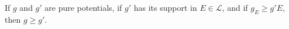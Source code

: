 If $g$ and $g'$ are pure potentials, if $g'$ has its support in $E \in \mathcal{L}$, and if $g_E \geq g'E$, then $g \geq g'$.
